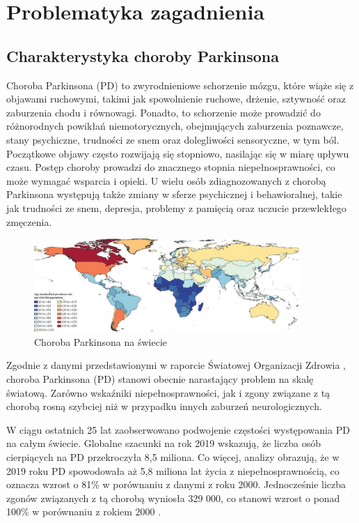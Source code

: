 \chapter{Problematyka zagadnienia}
\label{ch:problematyka}

\section{Charakterystyka choroby Parkinsona}
\label{sec:charakterystykaPD}

Choroba Parkinsona (PD) to zwyrodnieniowe schorzenie mózgu, które wiąże się z objawami ruchowymi, takimi jak spowolnienie ruchowe,
drżenie, sztywność oraz zaburzenia chodu i równowagi.
Ponadto, to schorzenie może prowadzić do różnorodnych powikłań niemotorycznych, obejmujących zaburzenia poznawcze, stany psychiczne,
trudności ze snem oraz dolegliwości sensoryczne, w tym ból.
Początkowe objawy często rozwijają się stopniowo, nasilając się w miarę upływu czasu.
Postęp choroby prowadzi do znacznego stopnia niepełnosprawności, co może wymagać wsparcia i opieki.
U wielu osób zdiagnozowanych z chorobą Parkinsona występują także zmiany w sferze psychicznej i behawioralnej, takie jak
trudności ze snem, depresja, problemy z pamięcią oraz uczucie przewlekłego zmęczenia.

\begin{figure}[htbp]
	\centering
	\includegraphics[width=0.9\textwidth]{./img/map}
	\caption{Choroba Parkinsona na świecie \cite{global_PD}}
    \label{fig:PD_map}
\end{figure}

Zgodnie z danymi przedstawionymi w raporcie Światowej Organizacji Zdrowia \cite{WHO}, choroba Parkinsona (PD) stanowi obecnie narastający problem na skalę światową. Zarówno wskaźniki niepełnosprawności, jak i zgony związane z tą chorobą rosną szybciej niż w przypadku innych zaburzeń neurologicznych.

W ciągu ostatnich 25 lat zaobserwowano podwojenie częstości występowania PD na całym świecie.
Globalne szacunki na rok 2019 wskazują, że liczba osób cierpiących na PD przekroczyła 8,5 miliona.
Co więcej, analizy obrazują, że w 2019 roku PD spowodowała aż 5,8 miliona lat życia z niepełnosprawnością, co oznacza wzrost o 81\% w porównaniu z danymi z roku 2000.
Jednocześnie liczba zgonów związanych z tą chorobą wyniosła 329 000, co stanowi wzrost o ponad 100\% w porównaniu z rokiem 2000 \cite{global_PD}.

